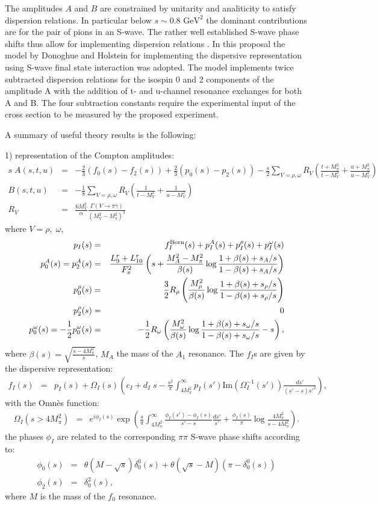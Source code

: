 \documentclass[12pt]{article}
\newcommand{\bea}{\begin{eqnarray}}
\newcommand{\eea}{\end{eqnarray}}
\begin{document}
The amplitudes $A$ and $B$ are constrained by unitarity and analiticity to satisfy dispersion relations. In particular below $s\sim 0.8\text{ GeV}^2$ the dominant contributions are for the pair of pions in an S-wave. The rather well established S-wave phase shifts thus allow for implementing  dispersion relations \cite{Donoghue others}.  In this proposal the model by Donoghue and Holstein \cite{Donoghue} for implementing the dispersive representation using S-wave final state interaction was adopted. The model implements   twice subtracted dispersion relations for the isospin 0 and 2 components of the  amplitude A with the addition of t- and u-channel resonance exchanges for both A and B. The four subtraction constants require the experimental input of the cross section to be measured by the proposed experiment. 

A summary of useful  theory results is the following:  

1) representation of the Compton amplitudes:
\bea
s\;A(s,t,u)&=& -\frac 23(f_0(s)-f_2(s))+\frac 23 (p_0(s)-p_2(s))-\frac s 2\sum_{V=\rho,\omega} R_V (\frac{t+M_\pi^2}{t-M_V^2}+\frac{u+M_\pi^2}{u-M_V^2})\nonumber\\
B(s,t,u)&=&-\frac 18 \sum_{V=\rho,\omega} R_V (\frac{1}{t-M_V^2}+\frac{1}{u-M_V^2})\nonumber\\
R_V&=&\frac{6 M_V^2}{\alpha} \frac{\Gamma(V\to \pi \gamma)}{(M_V^2-M_\pi^2)^3}
\eea
where $V=\rho,\;\omega$, 
\bea
p_I(s)&=& f_I^{\rm Born}(s)+p_I^A(s)+p^\rho_I(s)+p_I^\omega(s)\nonumber\\
p_0^A(s)=p_2^A(s)&=&\frac{L_9^r+L_{10}^r}{F_\pi^2}\left(s+\frac{M_A^2-M_\pi^2}{\beta(s)}\log\frac{1+\beta(s)+s_A/s}{1-\beta(s)+s_A/s}\right)\nonumber\\
p_0^\rho(s)&=&\frac 32 R_\rho\left( \frac{M_\rho^2}{\beta(s)}  \log\frac{1+\beta(s)+s_\rho/s}{1-\beta(s)+s_\rho/s}\right)\nonumber\\
p_2^\rho(s)&=&0\nonumber\\
p_0^\omega(s)=-\frac 12 p_0^\omega(s)&=&-\frac 12 R_\omega\left( \frac{M_\omega^2}{\beta(s)}  \log\frac{1+\beta(s)+s_\omega/s}{1-\beta(s)+s_\omega/s}-s\right),
\eea
where $\beta(s)=\sqrt{\frac{s-4 M_\pi^2}{s}}$, $M_A$ the mass of the $A_1$ resonance. The $f_I$s are given by the dispersive representation:
\bea
f_I(s)&=& p_I(s)+\Omega_I(s)\left(c_I+d_I\;s-\frac{s^2}{\pi} \int_{4M_\pi^2}^\infty p_I(s') \text{Im}(\Omega_I^{-1}(s'))\frac {ds'} {(s'-s) s'^2}\right),
\eea
with the Omn\`es function:
\bea\Omega_I(s>4 M_\pi^2)&=&e^{i\phi_I(s)} \exp\left(\frac s\pi\int_{4 M_\pi^2}^\infty \frac{\phi_I(s')-\phi_I(s)}{s'-s} \frac{ds'}{s'}+\frac{\phi_I(s)}{\pi}\log\frac{4M_\pi^2}{s-4M_\pi^2}\right).
\eea
the phases $\phi_I$ are related to the corresponding $\pi\pi$ S-wave phase shifts according to:
\bea
\phi_0(s)&=&\theta(M-\sqrt{s}) \delta_0^0(s)+\theta( \sqrt{s}-M)(\pi-\delta_0^0(s))\nonumber\\
\phi_2(s)&=&\delta_0^2(s),
\eea
where $M$ is the mass of the $f_0$ resonance.  
\end{document}
